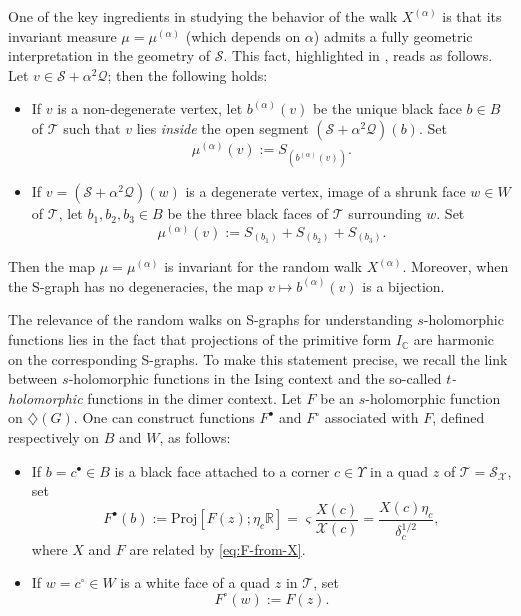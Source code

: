 \documentclass[reqno]{amsart}
\numberwithin{equation}{section}
\theoremstyle{definition}
\theoremstyle{remark}
\newcommand\C{\mathbb{C}}
\newcommand\cQ{\mathcal{Q}}
\newcommand\cS{\mathcal{S}}
\newcommand\cX{\mathcal{X}}
\newcommand\cT{\mathcal{T}}
\begin{document}
One of the key ingredients in studying the behavior of the walk $X^{(\alpha)}$ is that its invariant measure $\mu = \mu^{(\alpha)}$ (which depends on $\alpha$) admits a fully geometric interpretation in the geometry of $\cS$. This fact, highlighted in \cite[Corollary~4.9]{CLR1}, reads as follows. Let $v \in \cS + \alpha^2 \cQ$; then the following holds:
\begin{itemize}
    \item If $v$ is a non-degenerate vertex, let $b^{(\alpha)}(v)$ be the unique black face $b \in B$ of $\cT$ such that $v$ lies \emph{inside} the open segment $(\cS + \alpha^2 \cQ)(b)$. Set
    \begin{equation}
        \mu^{(\alpha)}(v) := S_{(b^{(\alpha)}(v))}.
    \end{equation}

    \item If $v = (\cS + \alpha^2 \cQ)(w)$ is a degenerate vertex, image of a shrunk face $w \in W$ of $\cT$, let $b_1, b_2, b_3 \in B$ be the three black faces of $\cT$ surrounding $w$. Set
    \begin{equation}
        \mu^{(\alpha)}(v) := S_{(b_1)} + S_{(b_2)} + S_{(b_3)}.
    \end{equation}
\end{itemize}
Then the map $\mu = \mu^{(\alpha)}$ is invariant for the random walk $X^{(\alpha)}$. Moreover, when the S-graph has no degeneracies, the map $v \mapsto b^{(\alpha)}(v)$ is a bijection.

The relevance of the random walks on S-graphs for understanding $s$-holomorphic functions lies in the fact that projections of the primitive form $I_{\C}$ are harmonic on the corresponding S-graphs. To make this statement precise, we recall the link between $s$-holomorphic functions in the Ising context and the so-called \emph{$t$-holomorphic} functions in the dimer context. Let $F$ be an $s$-holomorphic function on $\diamondsuit(G)$. One can construct functions $F^{\bullet}$ and $F^{\circ}$ associated with $F$, defined respectively on $B$ and $W$, as follows:
\begin{itemize}
    \item If $b = c^\bullet \in B$ is a black face attached to a corner $c \in \Upsilon$ in a quad $z$ of $\cT = \cS_\cX$, set
    \begin{equation}
        F^{\bullet}(b) := \mathrm{Proj}[F(z); \eta_c \mathbb{R}] = \varsigma \frac{X(c)}{\cX(c)} = \frac{X(c)\eta_c}{\delta_c^{1/2}},
    \end{equation}
    where $X$ and $F$ are related by \eqref{eq:F-from-X}.
    
    \item If $w = c^\circ \in W$ is a white face of a quad $z$ in $\cT$, set
    \begin{equation}
        F^{\circ}(w) := F(z).
    \end{equation}
\end{itemize}
\end{document}
